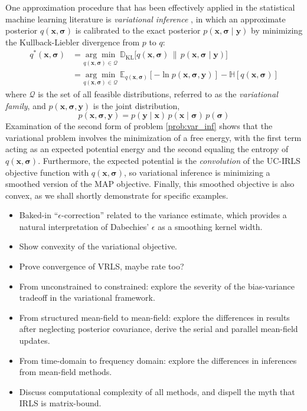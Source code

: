 \documentclass[final,5p,times,twocolumn]{elsarticle}
\newcommand{\m}[1]{\boldsymbol{#1}}
\newcommand{\E}[2]{\mathbb{E}_{#2}\left[ #1 \right]}
\newcommand{\entropy}[1]{\mathbb{H}\left[ #1 \right]}
\begin{document}
One approximation procedure that has been effectively applied in the
statistical machine learning literature is \emph{variational inference}
\cite{bishop2007}, in which an approximate posterior
$q(\m{x}, \m{\sigma})$ is calibrated to the exact posterior
$p(\m{x}, \m{\sigma} \mid \m{y})$ by minimizing the
Kullback-Liebler divergence from $p$ to $q$:
\begin{equation}
\begin{aligned}
q^*(\m{x}, \m{\sigma}) &=
 \underset{q(\m{x}, \m{\sigma}) \in \mathcal{Q}}{\arg\min} \;
 \mathbb{D}_{\text{KL}}\big[
  q(\m{x}, \m{\sigma}) \,\big\|\, p(\m{x}, \m{\sigma} \mid \m{y})
 \big]
\\ &=
 \underset{q(\m{x}, \m{\sigma}) \in \mathcal{Q}}{\arg\min} \;
 \E{-\ln p(\m{x}, \m{\sigma}, \m{y})}{q(\m{x}, \m{\sigma})} -
 \entropy{q(\m{x}, \m{\sigma})}
\end{aligned}
\label{prob:var_inf}
\end{equation}
where $\mathcal{Q}$ is the set of all feasible distributions, referred to
as the \emph{variational family}, and $p(\m{x}, \m{\sigma}, \m{y})$ is
the joint distribution,
\begin{equation}
p(\m{x}, \m{\sigma}, \m{y}) =
 p(\m{y} \mid \m{x}) \,
 p(\m{x} \mid \m{\sigma}) \,
 p(\m{\sigma})
\label{eq:joint}
\end{equation}
Examination of the second form of problem \eqref{prob:var_inf} shows
that the variational problem involves the minimization of a free
energy, with the first term acting as an expected potential energy
and the second equaling the entropy of $q(\m{x}, \m{\sigma})$.
Furthermore, the expected potential is the \emph{convolution} of
the UC-IRLS objective function with $q(\m{x}, \m{\sigma})$, so
variational inference is minimizing a smoothed version of the
MAP objective. Finally, this smoothed objective is also convex,
as we shall shortly demonstrate for specific examples. 

\begin{itemize}
 \item Baked-in ``$\epsilon$-correction'' related to the variance
  estimate, which provides a natural interpretation of Dabechies'
  $\epsilon$ as a smoothing kernel width.
 \item Show convexity of the variational objective.
 \item Prove convergence of VRLS, maybe rate too?
 \item From unconstrained to constrained: explore the severity of
  the bias-variance tradeoff in the variational framework.
 \item From structured mean-field to mean-field: explore the
  differences in results after neglecting posterior covariance,
  derive the serial and parallel mean-field updates.
 \item From time-domain to frequency domain: explore the differences
  in inferences from mean-field methods.
 \item Discuss computational complexity of all methods, and
  dispell the myth that IRLS is matrix-bound.
\end{itemize}
\end{document}

